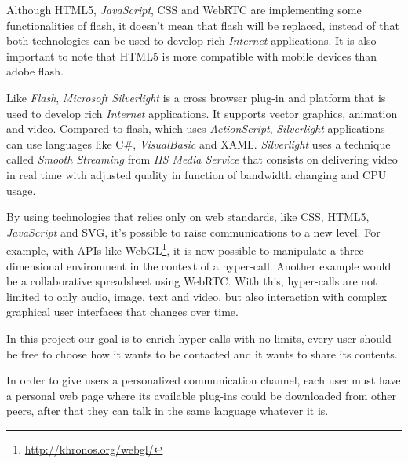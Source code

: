   Although \ac{HTML}5, \textit{JavaScript}, \ac{CSS} and \ac{WebRTC} are implementing some functionalities of flash, it doesn't mean that flash will be replaced, instead of that both technologies can be used to develop rich \textit{Internet} applications. It is also important to note that \ac{HTML}5 is more compatible with mobile devices than adobe flash. 

  Like \textit{Flash}, \textit{Microsoft Silverlight} is a cross browser plug-in and platform that is used to develop rich \textit{Internet} applications. It supports vector graphics, animation and video. Compared to flash, which uses \textit{ActionScript}, \textit{Silverlight} applications can use languages like C\#, \textit{VisualBasic} and \ac{XAML}. \textit{Silverlight} uses a technique called \textit{Smooth Streaming} from \textit{IIS Media Service} that consists on delivering video in real time with adjusted quality in function of bandwidth changing and \ac{CPU} usage.

  By using technologies that relies only on web standards, like \ac{CSS}, \ac{HTML}5, \textit{JavaScript} and \ac{SVG}, it's possible to raise communications to a new level. For example, with \ac{API}s like WebGL\footnote{\url{http://khronos.org/webgl/}}, it is now possible to manipulate a three dimensional environment in the context of a hyper-call. Another example would be a collaborative spreadsheet using \ac{WebRTC}. With this, hyper-calls are not limited to only audio, image, text and video, but also interaction with complex graphical user interfaces that changes over time.

  In this project our goal is to enrich hyper-calls with no limits, every user should be free to choose how it wants to be contacted and it wants to share its contents.

  In order to give users a personalized communication channel, each user must have a personal web page where its available plug-ins could be downloaded from other peers, after that they can talk in the same language whatever it is.
